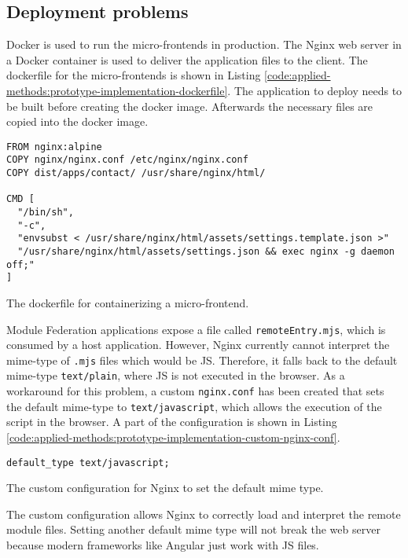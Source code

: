 \subsection{Deployment problems}\label{subsection:applied-methods:prototypical-implementation:nginx-problems}

Docker is used to run the micro-frontends in production. The Nginx web server in a Docker container is used to deliver the application files to the client. The dockerfile for the micro-frontends is shown in Listing \ref{code:applied-methods:prototype-implementation-dockerfile}. The application to deploy needs to be built before creating the docker image. Afterwards the necessary files are copied into the docker image.

\ifshowListings
  \begin{listing}[H]
  \begin{verbatim}
FROM nginx:alpine
COPY nginx/nginx.conf /etc/nginx/nginx.conf
COPY dist/apps/contact/ /usr/share/nginx/html/
    
CMD [
  "/bin/sh", 
  "-c", 
  "envsubst < /usr/share/nginx/html/assets/settings.template.json >" 
  "/usr/share/nginx/html/assets/settings.json && exec nginx -g daemon off;"
]
  \end{verbatim}
  \caption{The dockerfile for containerizing a micro-frontend.}\label{code:applied-methods:prototype-implementation-dockerfile}
  \end{listing}
\fi

\noindent Module Federation applications expose a file called \texttt{remoteEntry.mjs}, which is consumed by a host application. However, Nginx currently cannot interpret the mime-type of \texttt{\*.mjs} files which would be \ac{JS}. Therefore, it falls back to the default mime-type \texttt{text/plain}, where \ac{JS} is not executed in the browser. As a workaround for this problem, a custom \texttt{nginx.conf} has been created that sets the default mime-type to \texttt{text/javascript}, which allows the execution of the script in the browser. A part of the configuration is shown in Listing \ref{code:applied-methods:prototype-implementation-custom-nginx-conf}.

\ifshowListings
  \begin{listing}[H]
  \begin{verbatim}
default_type text/javascript;
  \end{verbatim}
  \caption{The custom configuration for Nginx to set the default mime type.}\label{code:applied-methods:prototype-implementation-custom-nginx-conf}
  \end{listing}
\fi

\noindent The custom configuration allows Nginx to correctly load and interpret the remote module files. Setting another default mime type will not break the web server because modern frameworks like Angular just work with \ac{JS} files.
